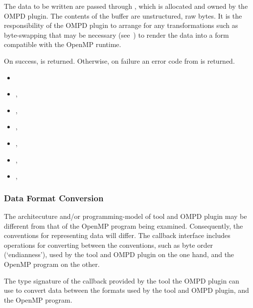 The data to be written are passed through , which is allocated and
owned by the OMPD plugin.
The contents of the buffer are unstructured, raw bytes.
It is the responsibility of the OMPD plugin to arrange for
any transformations such as byte-swapping that may be necessary
(see~)
to render the data into a form compatible with the OpenMP runtime.

On success,  is returned.
Otherwise, on failure an error code from  is returned.

\crossreferences
\begin{itemize}
\item
   
\item
  , 
\item
  , 
\item
  , 
\item
  , 
\item
  , 
\item
  , 
\end{itemize}

\subsubsection{Data Format Conversion}
\label{sec:ompd:data-format-conversion}

The architecuture and/or programming-model of tool and
OMPD plugin may be different from that of the OpenMP program being
examined.
Consequently, the conventions for representing data will differ.
The callback interface includes operations for converting between
the conventions, such as byte order (`endianness'),
used by the tool and OMPD plugin on the
one hand, and the OpenMP program on the other.

\label{sec:ompd:ompd_device_host_fn_t}

\summary

The type signature of the callback provided by the tool the
OMPD plugin can use to convert data between the formats used by the
tool and OMPD plugin, and the OpenMP program.

